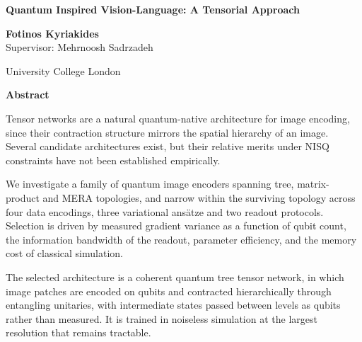 \documentclass[12pt, a4paper, oneside]{report}
\begin{document}

\begin{center}
    \vspace*{0.8cm}
    
    \Large \textbf{Quantum Inspired Vision-Language: A Tensorial Approach} \\

        
    \vspace{0.8cm}
    
    \large \textbf{Fotinos Kyriakides} \\
    \large Supervisor: Mehrnoosh Sadrzadeh \\
    \vspace{0.2cm}
    
    
    \large University College London \\
    \vspace{0.2cm}
    
    
    
    \large \textbf{Abstract}
    \end{center}
        
\normalsize


Tensor networks are a natural quantum-native architecture for image encoding, since their contraction structure mirrors the spatial hierarchy of an image. Several candidate architectures exist, but their relative merits under NISQ constraints have not been established empirically.

We investigate a family of quantum image encoders spanning tree, matrix-product and MERA topologies, and narrow within the surviving topology across four data encodings, three variational ansätze and two readout protocols. Selection is driven by measured gradient variance as a function of qubit count, the information bandwidth of the readout, parameter efficiency, and the memory cost of classical simulation.

The selected architecture is a coherent quantum tree tensor network, in which image patches are encoded on qubits and contracted hierarchically through entangling unitaries, with intermediate states passed between levels as qubits rather than measured. It is trained in noiseless simulation at the largest resolution that remains tractable.
\end{document}
